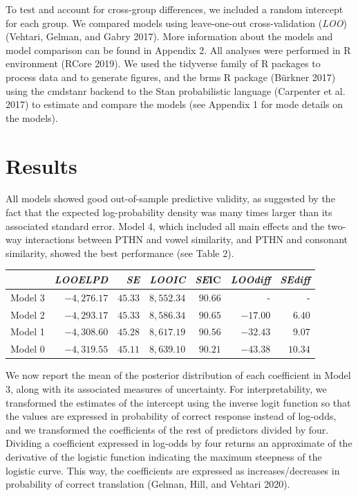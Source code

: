 \documentclass[
  man]{apa6}
\begin{document}
To test and account for cross-group differences, we included a random
intercept for each group. We compared models using leave-one-out
cross-validation (\emph{LOO}) (Vehtari, Gelman, and Gabry 2017). More
information about the models and model comparison can be found in
Appendix 2. All analyses were performed in R environment (RCore 2019).
We used the tidyverse family of R packages to process data and to
generate figures, and the brms R package (Bürkner 2017) using the
cmdstanr backend to the Stan probabilistic language (Carpenter et al.
2017) to estimate and compare the models (see Appendix 1 for mode
details on the models).

\hypertarget{results}{%
\section{Results}\label{results}}

All models showed good out-of-sample predictive validity, as suggested
by the fact that the expected log-probability density was many times
larger than its associated standard error. Model 4, which included all
main effects and the two-way interactions between PTHN and vowel
similarity, and PTHN and consonant similarity, showed the best
performance (see Table 2).

\captionsetup[table]{labelformat=empty,skip=1pt}
\begin{longtable}{lrrrrrr}
\toprule
 & \emph{\textbf{LOOELPD}} & \emph{\textbf{SE}} & \emph{\textbf{LOOIC}} & \textbf{\emph{SE}IC} & \emph{\textbf{LOOdiff}} & \emph{\textbf{SEdiff}} \\ 
\midrule
Model 3 & $-4,276.17$ & $45.33$ & $8,552.34$ & $90.66$ & - & - \\ 
Model 2 & $-4,293.17$ & $45.33$ & $8,586.34$ & $90.65$ & $-17.00$ & $6.40$ \\ 
Model 1 & $-4,308.60$ & $45.28$ & $8,617.19$ & $90.56$ & $-32.43$ & $9.07$ \\ 
Model 0 & $-4,319.55$ & $45.11$ & $8,639.10$ & $90.21$ & $-43.38$ & $10.34$ \\ 
 \bottomrule
\end{longtable}

We now report the mean of the posterior distribution of each coefficient
in Model 3, along with its associated measures of uncertainty. For
interpretability, we transformed the estimates of the intercept using
the inverse logit function so that the values are expressed in
probability of correct response instead of log-odds, and we transformed
the coefficients of the rest of predictors divided by four. Dividing a
coefficient expressed in log-odds by four returns an approximate of the
derivative of the logistic function indicating the maximum steepness of
the logistic curve. This way, the coefficients are expressed as
increases/decreases in probability of correct translation (Gelman, Hill,
and Vehtari 2020).
\end{document}
